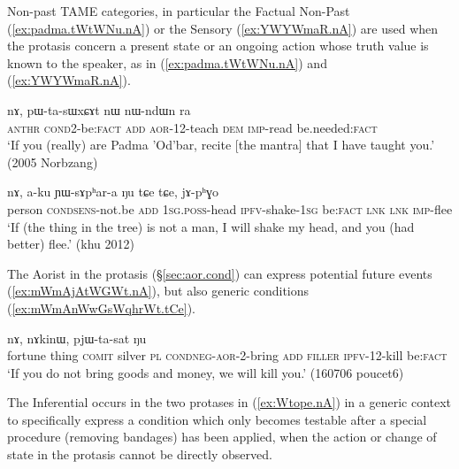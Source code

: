 Non-past TAME categories, in particular the Factual Non-Past (\ref{ex:padma.tWtWNu.nA}) or the Sensory (\ref{ex:YWYWmaR.nA}) are used when the protasis concern a present state or an ongoing action whose truth value is known to the speaker, as in (\ref{ex:padma.tWtWNu.nA}) and (\ref{ex:YWYWmaR.nA}).

\begin{exe}
\ex \label{ex:padma.tWtWNu.nA}
  nɤ, pɯ-ta-sɯxɕɤt nɯ nɯ-ndɯn ra \\
  \textsc{anthr} \textsc{cond}\redp{}2-be:\textsc{fact} \textsc{add} \textsc{aor}-1\fl{}2-teach \textsc{dem} \textsc{imp}-read be.needed:\textsc{fact} \\
 \glt `If you (really) are Padma 'Od'bar, recite [the mantra] that I have taught you.' (2005 Norbzang)
\end{exe}

\begin{exe}
\ex \label{ex:YWYWmaR.nA}
  nɤ, a-ku ɲɯ-sɤpʰar-a ŋu tɕe tɕe, jɤ-pʰɣo \\
 person \textsc{cond}\redp{}\textsc{sens}-not.be \textsc{add} \textsc{1sg}.\textsc{poss}-head \textsc{ipfv}-shake-\textsc{1sg} be:\textsc{fact} \textsc{lnk} \textsc{lnk} \textsc{imp}-flee \\
\glt `If (the thing in the tree) is not a man, I will shake my head, and you (had better) flee.' (khu 2012)
\end{exe}

The Aorist in the protasis (§\ref{sec:aor.cond}) can express potential future events  (\ref{ex:mWmAjAtWGWt.nA}), but also generic conditions (\ref{ex:mWmAnWwGsWqhrWt.tCe}).

\begin{exe}
\ex \label{ex:mWmAjAtWGWt.nA}
  nɤ, nɤkinɯ, pjɯ-ta-sat ŋu \\
 fortune thing \textsc{comit} silver \textsc{pl} \textsc{cond}\redp{}\textsc{neg}-\textsc{aor}-2-bring \textsc{add} \textsc{filler} \textsc{ipfv}-1\fl{}2-kill be:\textsc{fact} \\
 \glt `If you do not bring goods and money, we will kill you.' (160706 poucet6)
 \end{exe}

The Inferential occurs in the two protases in (\ref{ex:Wtope.nA}) in a generic context to specifically express a condition which only becomes testable after a special procedure (removing bandages) has been applied, when the action or change of state in the protasis cannot be directly observed.

